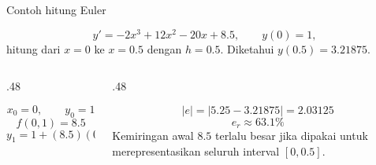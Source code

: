 \documentclass[aspectratio=169,10pt]{beamer}
\begin{document}
\begin{frame}{Contoh hitung Euler}
\scriptsize
\begin{bluebox}
\[
y'=-2x^3+12x^2-20x+8.5,\qquad y(0)=1,
\]
hitung dari $x=0$ ke $x=0.5$ dengan $h=0.5$. Diketahui $y(0.5)=3.21875$.
\end{bluebox}
\begin{columns}[T,totalwidth=\textwidth]
\begin{column}{.48\textwidth}
\begin{orangebox}
\[
x_0=0,\qquad y_0=1
\]
\[
f(0,1)=8.5
\]
\[
\boxed{y_1=1+(8.5)(0.5)=5.25}
\]
\end{orangebox}
\end{column}
\begin{column}{.48\textwidth}
\begin{purplebox}[Evaluasi]
\[
|e|=|5.25-3.21875|=2.03125
\]
\[
e_r\approx 63.1\%
\]
Kemiringan awal $8.5$ terlalu besar jika dipakai untuk merepresentasikan seluruh interval $[0,0.5]$.
\end{purplebox}
\end{column}
\end{columns}
\end{frame}
\end{document}
